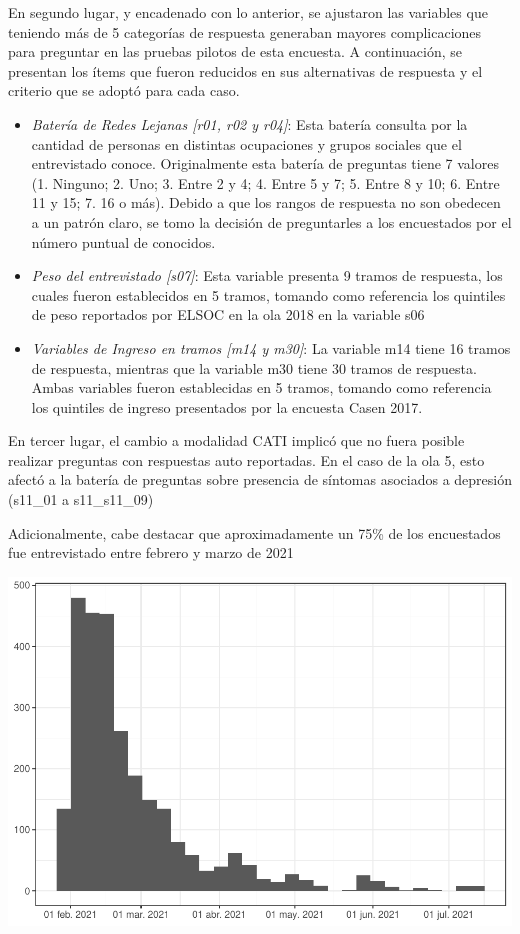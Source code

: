 \documentclass[
  12pt,
]{book}
\begin{document}
En segundo lugar, y encadenado con lo anterior, se ajustaron las variables que teniendo más de 5 categorías de respuesta generaban mayores complicaciones para preguntar en las pruebas pilotos de esta encuesta. A continuación, se presentan los ítems que fueron reducidos en sus alternativas de respuesta y el criterio que se adoptó para cada caso.

\begin{itemize}
\item
  \emph{Batería de Redes Lejanas {[}r01, r02 y r04{]}}: Esta batería consulta por la cantidad de personas en distintas ocupaciones y grupos sociales que el entrevistado conoce. Originalmente esta batería de preguntas tiene 7 valores (1. Ninguno; 2. Uno; 3. Entre 2 y 4; 4. Entre 5 y 7; 5. Entre 8 y 10; 6. Entre 11 y 15; 7. 16 o más). Debido a que los rangos de respuesta no son obedecen a un patrón claro, se tomo la decisión de preguntarles a los encuestados por el número puntual de conocidos.
\item
  \emph{Peso del entrevistado {[}s07{]}}: Esta variable presenta 9 tramos de respuesta, los cuales fueron establecidos en 5 tramos, tomando como referencia los quintiles de peso reportados por ELSOC en la ola 2018 en la variable s06
\item
  \emph{Variables de Ingreso en tramos {[}m14 y m30{]}}: La variable m14 tiene 16 tramos de respuesta, mientras que la variable m30 tiene 30 tramos de respuesta. Ambas variables fueron establecidas en 5 tramos, tomando como referencia los quintiles de ingreso presentados por la encuesta Casen 2017.
\end{itemize}

En tercer lugar, el cambio a modalidad CATI implicó que no fuera posible realizar preguntas con respuestas auto reportadas. En el caso de la ola 5, esto afectó a la batería de preguntas sobre presencia de síntomas asociados a depresión (s11\_01 a s11\_s11\_09)

Adicionalmente, cabe destacar que aproximadamente un 75\% de los encuestados fue entrevistado entre febrero y marzo de 2021

\begin{center}\includegraphics{reporte-elsoc_files/figure-latex/hist-fecha-2021-1} \end{center}
\end{document}
